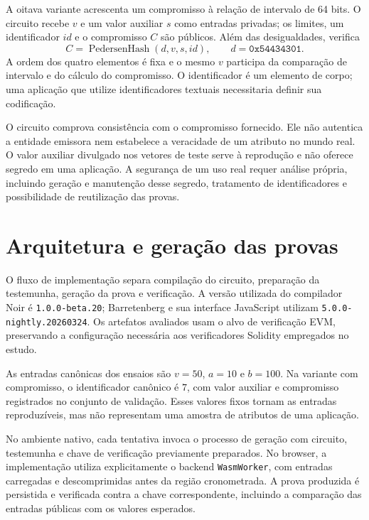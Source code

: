 A oitava variante acrescenta um compromisso à relação de intervalo de 64 bits. O circuito recebe $v$ e um valor auxiliar $s$ como entradas privadas; os limites, um identificador $id$ e o compromisso $C$ são públicos. Além das desigualdades, verifica
\begin{equation}
  C=\operatorname{PedersenHash}(d,v,s,id),
  \qquad d=\texttt{0x54434301}.
  \label{eq:compromisso}
\end{equation}
A ordem dos quatro elementos é fixa e o mesmo $v$ participa da comparação de intervalo e do cálculo do compromisso. O identificador é um elemento de corpo; uma aplicação que utilize identificadores textuais necessitaria definir sua codificação.

O circuito comprova consistência com o compromisso fornecido. Ele não autentica a entidade emissora nem estabelece a veracidade de um atributo no mundo real. O valor auxiliar divulgado nos vetores de teste serve à reprodução e não oferece segredo em uma aplicação. A segurança de um uso real requer análise própria, incluindo geração e manutenção desse segredo, tratamento de identificadores e possibilidade de reutilização das provas.

\section{Arquitetura e geração das provas}

O fluxo de implementação separa compilação do circuito, preparação da testemunha, geração da prova e verificação. A versão utilizada do compilador Noir é \texttt{1.0.0-beta.20}; Barretenberg e sua interface JavaScript utilizam \texttt{5.0.0-nightly.20260324}. Os artefatos avaliados usam o alvo de verificação EVM, preservando a configuração necessária aos verificadores Solidity empregados no estudo.

As entradas canônicas dos ensaios são $v=50$, $a=10$ e $b=100$. Na variante com compromisso, o identificador canônico é $7$, com valor auxiliar e compromisso registrados no conjunto de validação. Esses valores fixos tornam as entradas reproduzíveis, mas não representam uma amostra de atributos de uma aplicação.

No ambiente nativo, cada tentativa invoca o processo de geração com circuito, testemunha e chave de verificação previamente preparados. No browser, a implementação utiliza explicitamente o backend \texttt{WasmWorker}, com entradas carregadas e descomprimidas antes da região cronometrada. A prova produzida é persistida e verificada contra a chave correspondente, incluindo a comparação das entradas públicas com os valores esperados.

